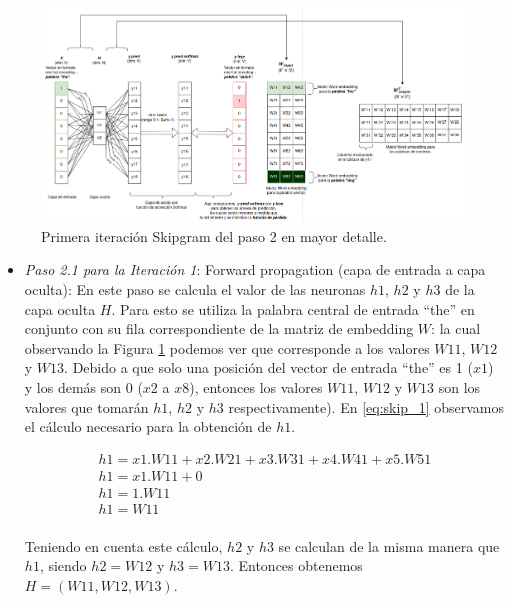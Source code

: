 \documentclass[12pt,a4paper]{article}
\begin{document}
\begin{sloppypar}
\begin{enumerate}
\begin{itemize}
\begin{figure}[H]    %
\centering
\includegraphics[width=1\textwidth]{images/Ejemplo_Skipgram/6_EjSkip.png}
 \captionsetup{justification=centering,margin=3.5cm}
\caption{Primera iteración Skipgram del paso 2 en mayor detalle.} 
\label{fig:6_EjSkip}
\end{figure}

\begin{itemize}
\item \textit{Paso 2.1 para la Iteración 1}: Forward propagation (capa de entrada a capa oculta): En este paso se calcula el valor de las neuronas $h1$, $h2$ y $h3$ de la capa oculta $H$. Para esto se utiliza la palabra central de entrada “the” en conjunto con su fila correspondiente de la matriz de embedding $W$: la cual observando la Figura \ref{fig:6_EjSkip} podemos ver que corresponde a los valores $W11$, $W12$ y $W13$. Debido a que solo una posición del vector de entrada “the” es 1 ($x1$) y los demás son 0 ($x2$ a $x8$), entonces los valores $W11$, $W12$ y $W13$ son los valores que tomarán $h1$, $h2$ y $h3$ respectivamente). En \ref{eq:skip_1} observamos el cálculo necesario para la obtención de $h1$.

\begin{equation}\label{eq:skip_1}
\begin{gathered}
h1 = x1 . W11 + x2 . W21 + x3 . W31 + x4 . W41 + x5 . W51 \\ 
h1 = x1 . W11 + 0 \\ 
h1 = 1 . W11 \\  
h1 = W11 
\end{gathered}
\end{equation}
\\
Teniendo en cuenta este cálculo, $h2$ y $h3$ se calculan de la misma manera que $h1$, siendo $h2 = W12$ y $h3 = W13$. Entonces obtenemos $H = (W11, W12, W13)$. \\


\end{itemize}
\end{itemize}
\end{enumerate}
\end{sloppypar}
\end{document}
